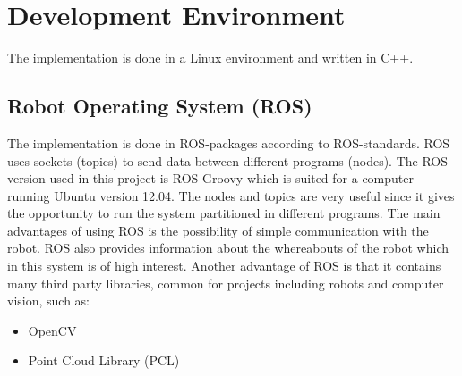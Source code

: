 
\section{Development Environment}
The implementation is done in a Linux environment and written in C++.

\subsection{Robot Operating System (ROS)}
The implementation is done in ROS-packages according to ROS-standards. ROS uses sockets (topics) to send data between different programs (nodes). The ROS-version used in this project is ROS Groovy which is suited for a computer running Ubuntu version 12.04. The nodes and topics are very useful since it gives the opportunity to run the system partitioned in different programs. The main advantages of using ROS is the possibility of simple communication with the robot. ROS also provides information about the whereabouts of the robot which in this system is of high interest. Another advantage of ROS is that it contains many third party libraries, common for projects including robots and computer vision, such as: 

\begin{itemize}
\item OpenCV
\item Point Cloud Library (PCL)
\end{itemize}

